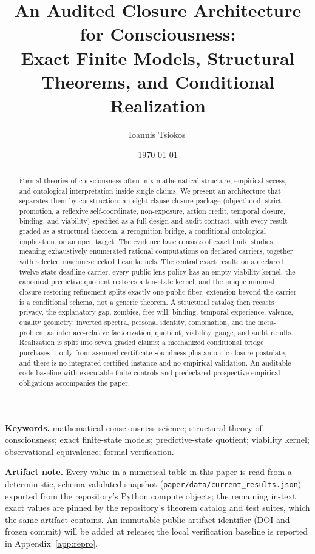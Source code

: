 \documentclass[11pt]{article}
\title{An Audited Closure Architecture for Consciousness:\\
Exact Finite Models, Structural Theorems, and Conditional Realization}
\author{Ioannis Tsiokos\,\orcidlink{0009-0009-7659-5964}}
\date{\today}
\theoremstyle{definition}
\begin{document}
\maketitle
\thispagestyle{firstpage}

\begin{abstract}
Formal theories of consciousness often mix mathematical structure, empirical
access, and ontological interpretation inside single claims. We present an
architecture that separates them by construction: an eight-clause closure
package (objecthood, strict promotion, a reflexive self-coordinate,
non-exposure, action credit, temporal closure, binding, and viability)
specified as a full design and audit contract, with every result graded as a
structural theorem, a recognition bridge, a conditional ontological
implication, or an open target. The evidence base consists of exact finite
studies, meaning exhaustively enumerated rational computations on declared
carriers, together with selected machine-checked Lean kernels. The central exact
result: on a declared twelve-state deadline carrier, every public-lens policy
has an empty viability kernel, the canonical predictive quotient restores a
ten-state kernel, and the unique minimal closure-restoring refinement splits
exactly one public fiber; extension beyond the carrier is a conditional
schema, not a generic theorem. A structural catalog then recasts privacy, the
explanatory gap, zombies, free will, binding, temporal experience, valence,
quality geometry, inverted spectra, personal identity, combination, and the
meta-problem as interface-relative factorization, quotient, viability, gauge,
and audit results. Realization is split into seven graded claims: a mechanized
conditional bridge purchases it only from assumed certificate soundness plus
an ontic-closure postulate, and there is no integrated certified instance and
no empirical validation. An auditable code baseline with executable
finite controls and predeclared prospective empirical obligations accompanies
the paper.
\end{abstract}

\medskip
\noindent\textbf{Keywords.} mathematical consciousness science; structural
theory of consciousness; exact finite-state models; predictive-state quotient;
viability kernel; observational equivalence; formal verification.

\medskip
\noindent\textbf{Artifact note.} Every value in a numerical table in this
paper is read from a deterministic, schema-validated snapshot
(\texttt{paper/data/current\_results.json}) exported from the repository's
Python compute objects; the remaining in-text exact values are pinned by the
repository's theorem catalog and test suites, which the same artifact
contains. An immutable public artifact
identifier (DOI and frozen commit) will be added at release; the local
verification baseline is reported in Appendix~\ref{app:repro}.
\end{document}
